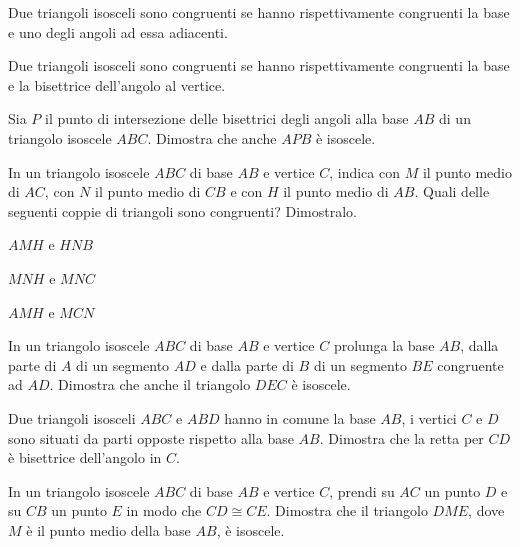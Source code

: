 \begin{multicols}{2}
\begin{esercizio}
\label{ese:2.31}
Due triangoli isosceli sono congruenti se hanno rispettivamente 
congruenti la base e uno degli angoli ad essa adiacenti.
\end{esercizio}

\begin{esercizio}
\label{ese:2.32}
Due triangoli isosceli sono congruenti se hanno rispettivamente 
congruenti la base e la bisettrice dell'angolo al vertice.
\end{esercizio}

\begin{esercizio}
\label{ese:2.34}
Sia $P$ il punto di intersezione delle bisettrici degli angoli alla 
base $AB$ di un triangolo isoscele $ABC$. Dimostra che anche $APB$ è 
isoscele.
\end{esercizio}

\begin{esercizio}
\label{ese:2.36}
In un triangolo isoscele $ABC$ di base $AB$ e vertice $C$, indica con 
$M$ il punto medio di $AC$, con $N$ il punto medio di $CB$ e con $H$ 
il punto medio di $AB$. Quali delle seguenti coppie di triangoli sono 
congruenti? Dimostralo.
\begin{multicols}{2}
\begin{enumeratea}
\item $AMH$ e $HNB$
\item $MNH$ e $MNC$
\item $AMH$ e $MCN$
\end{enumeratea}
\end{multicols}
\end{esercizio}

\begin{esercizio}
\label{ese:2.38}
In un triangolo isoscele $ABC$ di base $AB$ e vertice $C$ prolunga la 
base $AB$, dalla parte di $A$ di un segmento $AD$ e dalla parte di 
$B$ di un segmento $BE$ congruente ad $AD$. Dimostra che anche il 
triangolo $DEC$ è isoscele.
\end{esercizio}

\begin{esercizio}
\label{ese:2.40}
Due triangoli isosceli $ABC$ e $ABD$ hanno in comune la base $AB$, i 
vertici $C$ e $D$ sono situati da parti opposte rispetto alla base 
$AB$. Dimostra che la retta per $CD$ è bisettrice dell'angolo in $C$.
\end{esercizio}

\begin{esercizio}
\label{ese:2.45}
In un triangolo isoscele $ABC$ di base $AB$ e vertice $C$, prendi su 
$AC$ un punto $D$ e su $CB$ un punto $E$ in modo che $CD\cong CE$. 
Dimostra che il triangolo $DME$, dove $M$ è il punto medio della base 
$AB$, è isoscele.
\end{esercizio}


\end{multicols}
